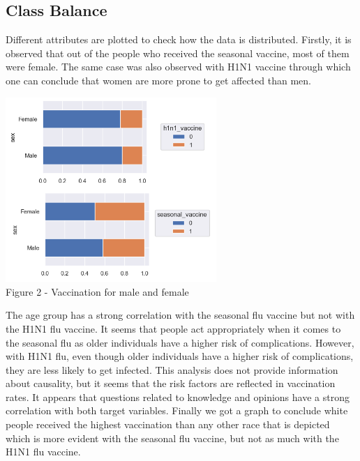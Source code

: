 \documentclass{IEEEtran}
\begin{document}
\subsection{Class Balance}
Different attributes are plotted to check how the data is distributed.
Firstly, it is observed that out of the people who received the seasonal vaccine, most of them were female. The same case was also observed with H1N1 vaccine through which one can conclude that women are more prone to get affected than men.
\begin{center}
    \includegraphics[width = 8cm,height=7cm]{figures/Sex.png}\\  Figure 2 - Vaccination for male and female
\end{center}

The age group has a strong correlation with the seasonal flu vaccine but not with the H1N1 flu vaccine. It seems that people act appropriately when it comes to the seasonal flu as older individuals have a higher risk of complications. However, with H1N1 flu, even though older individuals have a higher risk of complications, they are less likely to get infected. This analysis does not provide information about causality, but it seems that the risk factors are reflected in vaccination rates.
It appears that questions related to knowledge and opinions have a strong correlation with both target variables. Finally we got a  graph to conclude white people received the highest vaccination than any other race that is depicted which is more evident with the seasonal flu vaccine, but not as much with the H1N1 flu vaccine. 
\end{document}
